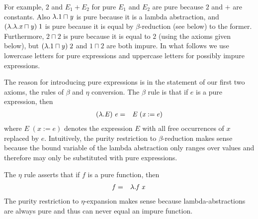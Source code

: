 \documentclass{llncs}
\newcommand{\Conid}[1]{\mathit{#1}}
\newcommand{\Varid}[1]{\mathit{#1}}
\newcommand*\hscompose[2]{#1}
\newcommand\hslambda{\global\let\hsarrow=\hsarrowperiodonce}
\newcommand*\hsarrowperiodonce[2]{#2\global\let\hsarrow=\hscompose}
\begin{document}
For example, \ensuremath{\mathrm{2}} and \ensuremath{\Conid{E}_{1}\mathbin{+}\Conid{E}_{2}} for pure \ensuremath{\Conid{E}_{1}} 
and \ensuremath{\Conid{E}_{2}} are pure because \ensuremath{\mathrm{2}} and \ensuremath{\mathbin{+}} are constants. Also \ensuremath{\lambda \hslambda \Varid{y}\hsarrow{\rightarrow }{\mathpunct{.}}\mathrm{1}\mathbin{\sqcap}\Varid{y}} is pure because it is 
a lambda abstraction, and \ensuremath{(\lambda \hslambda \Varid{x}\hsarrow{\rightarrow }{\mathpunct{.}}\lambda \hslambda \Varid{y}\hsarrow{\rightarrow }{\mathpunct{.}}\Varid{x}\mathbin{\sqcap}\Varid{y})\;\mathrm{1}} is pure because it is equal by \ensuremath{\beta }-reduction
(see below) to the former. Furthermore, \ensuremath{\mathrm{2}\mathbin{\sqcap}\mathrm{2}} is pure because it is equal to \ensuremath{\mathrm{2}} (using the 
axioms given below), but \ensuremath{(\lambda \hslambda \Varid{y}\hsarrow{\rightarrow }{\mathpunct{.}}\mathrm{1}\mathbin{\sqcap}\Varid{y})\;\mathrm{2}} and \ensuremath{\mathrm{1}\mathbin{\sqcap}\mathrm{2}} are both impure.
In what follows we use 
lowercase letters for pure expressions and uppercase letters for possibly impure expressions. 


The reason for introducing pure expressions is in the statement of our 
first two axioms, the rules of \ensuremath{\beta } and \ensuremath{\eta } conversion. The \ensuremath{\beta } rule is that if 
\ensuremath{\Varid{e}} is a pure expression, then
\begin{eqnarray}
\label{beta}
\ensuremath{(\lambda \hslambda \Varid{x}\hsarrow{\rightarrow }{\mathpunct{.}}\Conid{E})\;\Varid{e}} &=& \ensuremath{\Conid{E}\;(\Varid{x}\mathbin{:=}\Varid{e})}
\end{eqnarray}
where \ensuremath{\Conid{E}\;(\Varid{x}\mathbin{:=}\Varid{e})} denotes the expression \ensuremath{\Conid{E}} with all free occurrences of \ensuremath{\Varid{x}} replaced by \ensuremath{\Varid{e}}.
Intuitively, the purity restriction to \ensuremath{\beta }-reduction makes sense because the bound variable 
of the lambda abstraction only ranges over values and therefore may only be substituted with 
pure expressions.

The \ensuremath{\eta } rule asserts that if \ensuremath{\Varid{f}} is a pure function, then
\begin{eqnarray}
\label{eta}
\ensuremath{\Varid{f}}          &=& \ensuremath{\lambda \hslambda \Varid{x}\hsarrow{\rightarrow }{\mathpunct{.}}\Varid{f}\;\Varid{x}}
\end{eqnarray}
The purity restriction to \ensuremath{\eta }-expansion makes sense because lambda-abstractions are 
always pure and thus can never equal an impure function.
\end{document}
